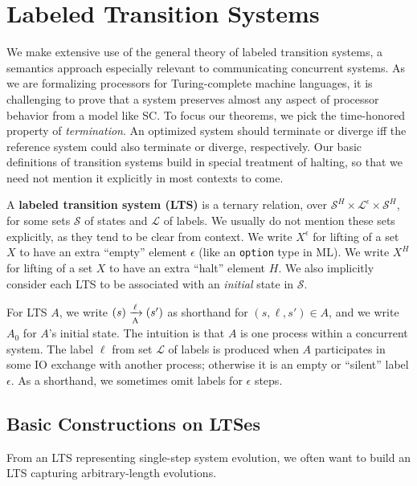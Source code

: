 \section{Labeled Transition Systems}\label{sec:lts}

We make extensive use of the general theory of labeled transition
systems, a semantics approach especially relevant to communicating
concurrent systems.  As we are formalizing processors for
Turing-complete machine languages, it is challenging to prove that a
system preserves almost any aspect of processor behavior from a model
like SC.  To focus our theorems, we pick the time-honored property of
\emph{termination}.  An optimized system should terminate or diverge
iff the reference system could also terminate or diverge,
respectively.  Our basic definitions of transition systems build in
special treatment of halting, so that we need not mention it
explicitly in most contexts to come.

\begin{defn}
A \textbf{labeled transition system (LTS)} is a ternary relation, over
$\mathcal S^H \times \mathcal L^\epsilon \times \mathcal S^H$, for some sets
$\mathcal S$ of states and $\mathcal L$ of labels. We usually do not mention
these sets explicitly, as they tend to be clear from context. We write
$X^\epsilon$ for lifting of a set $X$ to have an extra ``empty'' element
$\epsilon$ (like an \texttt{option} type in ML). We write $X^H$ for lifting of
a set $X$ to have an extra ``halt'' element $H$. We also implicitly consider
each LTS to be associated with an \emph{initial} state in $\mathcal S$.
\end{defn}

For LTS $A$, we write $\io{A}{s}{s'}{\ell}$ as shorthand for $(s, \ell, s') \in
A$, and we write $A_0$ for $A$'s initial state. The intuition is that $A$ is
one process within a concurrent system. The label $\ell$ from set $\mathcal L$
of labels is produced when $A$ participates in some IO exchange with another
process; otherwise it is an empty or ``silent'' label $\epsilon$. As a
shorthand, we sometimes omit labels for $\epsilon$ steps.

\subsection{Basic Constructions on LTSes}

From an LTS representing single-step system evolution, we often want to build
an LTS capturing arbitrary-length evolutions.


